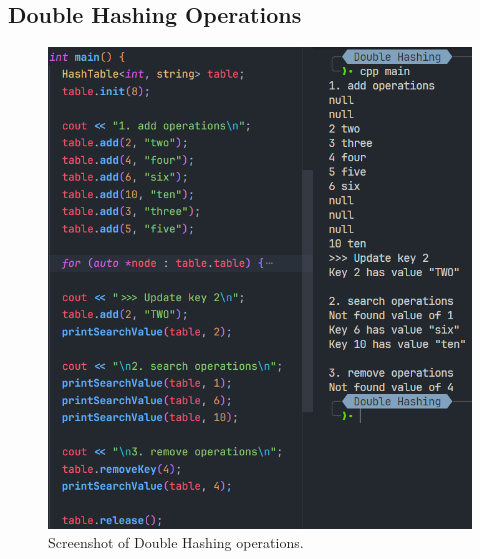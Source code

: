 \pagebreak
\subsection{Double Hashing Operations}
\begin{figure}[!ht]
	\centering
	\includegraphics[width=\textwidth]{imgs/Double Hashing/operations.png}
	\caption{Screenshot of Double Hashing operations.}\label{fig:dblhashing-operations}
\end{figure}